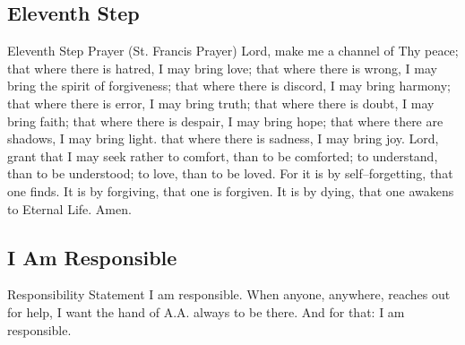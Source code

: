 \documentclass{beamer}
\begin{document}
    \subsection{Eleventh Step}
                    \begin{frame}[plain]\large
        \begin{alertblock}{Eleventh Step Prayer (St. Francis Prayer)}
    Lord, make me a channel of Thy peace; that where there is hatred, I may bring love; that where there is wrong, I may bring the spirit of forgiveness; that where there is discord, I may bring harmony; that where there is error, I may bring truth; that where there is doubt, I may bring faith; that where there is despair, I may bring hope; that where there are shadows, I may bring light. that where there is sadness, I may bring joy. Lord, grant that I may seek rather to comfort, than to be comforted; to understand, than to be understood; to love, than to be loved.  For it is by self--forgetting, that one finds. It is by forgiving, that one is forgiven. It is by dying, that one awakens to Eternal Life. Amen.
\end{alertblock}
    \end{frame}
    
    \subsection{I Am Responsible}
\begin{frame}[plain]\LARGE
\begin{alertblock}{Responsibility Statement}
I am responsible. When anyone, anywhere, reaches out for help, I want the hand of A.A. always to be there. And for that: I am responsible.
\end{alertblock}
\end{frame}

    
\end{document}
